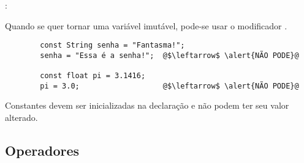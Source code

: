 \begin{frame}[fragile]{\insertsection: \insertsubsection}

	Quando se quer tornar uma variável imutável, pode-se usar o modificador \texttt{}.
	\begin{verbatim}
		const String senha = "Fantasma!";
		senha = "Essa é a senha!";  @$\leftarrow$ \alert{NÃO PODE}@

		const float pi = 3.1416;
		pi = 3.0;                   @$\leftarrow$ \alert{NÃO PODE}@
	\end{verbatim}

	Constantes devem ser inicializadas na declaração e não podem ter seu valor alterado.

\end{frame}


\subsection{Operadores}


